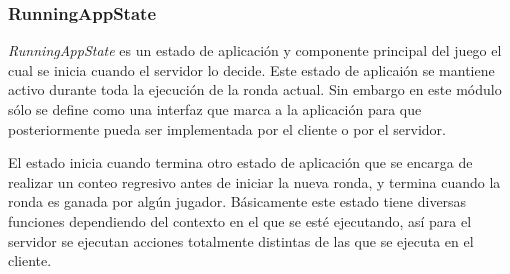 \documentclass[a4paper,12pt,openany,oneside]{book}
\begin{document}
\subsubsection{RunningAppState}
\textit{RunningAppState} es un estado de aplicación y componente principal del juego el cual se inicia cuando el servidor lo decide. Este estado de aplicaión se mantiene activo durante toda la ejecución de la ronda actual. Sin embargo en este módulo sólo se define como una interfaz que marca a la aplicación para que posteriormente pueda ser implementada por el cliente o por el servidor.

El estado inicia cuando termina otro estado de aplicación que se encarga de realizar un conteo regresivo antes de iniciar la nueva ronda, y termina cuando la ronda es ganada por algún jugador. Básicamente este estado tiene diversas funciones dependiendo del contexto en el que se esté ejecutando, así para el servidor se ejecutan acciones totalmente distintas de las que se ejecuta en el cliente.
\end{document}
